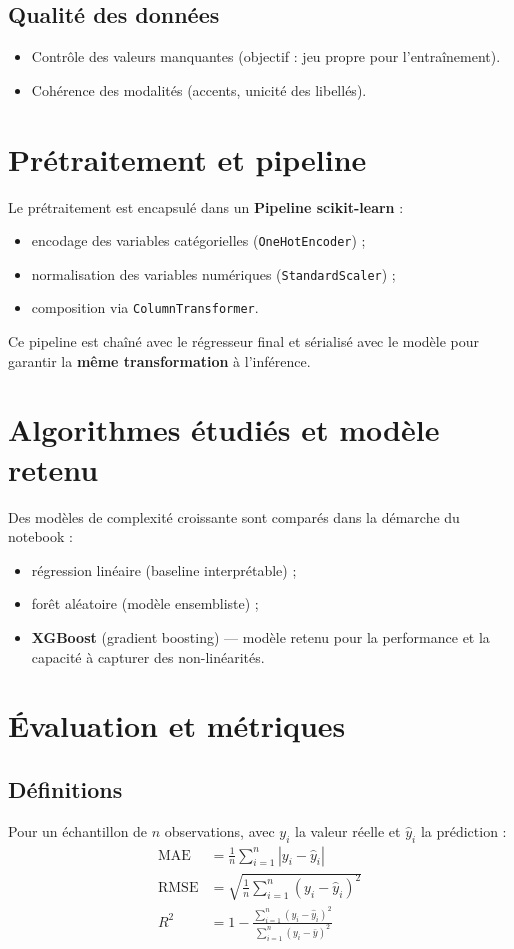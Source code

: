 \documentclass[12pt,a4paper,twoside,openright]{report}
\begin{document}
\subsection{Qualité des données}
\begin{itemize}
  \item Contrôle des valeurs manquantes (objectif : jeu propre pour l'entraînement).
  \item Cohérence des modalités (accents, unicité des libellés).
\end{itemize}

\section{Prétraitement et pipeline}

Le prétraitement est encapsulé dans un \textbf{Pipeline scikit-learn} :
\begin{itemize}
  \item encodage des variables catégorielles (\texttt{OneHotEncoder}) ;
  \item normalisation des variables numériques (\texttt{StandardScaler}) ;
  \item composition via \texttt{ColumnTransformer}.
\end{itemize}

Ce pipeline est chaîné avec le régresseur final et sérialisé avec le modèle pour garantir la \textbf{même transformation} à l'inférence.

\section{Algorithmes étudiés et modèle retenu}

Des modèles de complexité croissante sont comparés dans la démarche du notebook :
\begin{itemize}
  \item régression linéaire (baseline interprétable) ;
  \item forêt aléatoire (modèle ensembliste) ;
  \item \textbf{XGBoost} (gradient boosting) — modèle retenu pour la performance et la capacité à capturer des non-linéarités.
\end{itemize}

\section{Évaluation et métriques}

\subsection{Définitions}
Pour un échantillon de $n$ observations, avec $y_i$ la valeur réelle et $\hat{y}_i$ la prédiction :
\begin{align}
  \mathrm{MAE} &= \frac{1}{n} \sum_{i=1}^{n} \left| y_i - \hat{y}_i \right| \\
  \mathrm{RMSE} &= \sqrt{\frac{1}{n} \sum_{i=1}^{n} \left( y_i - \hat{y}_i \right)^2} \\
  R^2 &= 1 - \frac{\sum_{i=1}^{n}(y_i-\hat{y}_i)^2}{\sum_{i=1}^{n}(y_i-\bar{y})^2}
\end{align}
\end{document}
